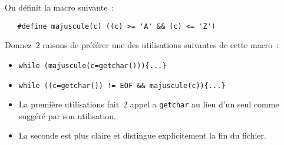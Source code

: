  On d\'efinit la macro suivante~:
\begin{verbatim}
   #define majuscule(c) ((c) >= 'A' && (c) <= 'Z')
\end{verbatim}
Donnez~$2$ raisons de pr\'ef\'erer une des utilisations suivantes de cette macro~:
\begin{itemize}
\item \verb+while (majuscule(c=getchar())){...}+
\item \verb+while ((c=getchar()) != EOF && majuscule(c)){...}+
\end{itemize}
\ifcorrection%
\begin{correction}
  \begin{itemize}
  \item La premi\`ere utilisations fait~$2$ appel a \verb?getchar? au lieu d'un seul comme sugg\'er\'e par son utilisation.
  \item La seconde est plus claire et distingue explicitement la fin du fichier.
 \end{itemize}
\end{correction}
\fi
